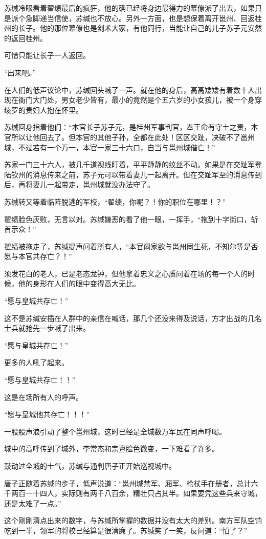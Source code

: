 苏缄冷眼看着翟绩最后的疯狂，他的确已经将身边最得力的幕僚派了出去，如果只是派个急脚递当信使，苏缄也不放心。另外一方面，也是想保着离开邕州、回返桂州的长子。他的那位幕僚也是剑术大家，有他同行，当能让自己的儿子苏子元安然的返回桂州。

可惜只能让长子一人返回。

“出来吧。”

在人们的低声议论中，苏缄回头喊了一声。就在他的身后，高高矮矮有着数十人出现在衙门大门处，男女老少皆有，最小的竟然是个五六岁的小女孩儿，被一个身穿绫罗的贵妇人抱在怀里。

苏缄回身指着他们：“本官长子苏子元，是桂州军事判官，奉王命有守土之责，本官所以让他回去了。但本官的其他子孙，全都在此处！区区交趾，决破不了邕州城，不过若有一个万一，本官一家三十六口，自当与邕州城偕亡！”

苏家一门三十六人，被几千道视线盯着，平平静静的纹丝不动。如果是在交趾军登陆钦州的消息传来之前，苏子元可以带着妻儿一起离开。但在交趾军至的消息传到后，再将妻儿一起带走，邕州城就没办法守了。

苏缄转又等着临阵脱逃的军校，“翟绩，你呢？！你的职位在哪里！？”

翟绩脸色灰败，无言以对。苏缄嫌恶的看了他一眼，一挥手，“拖到十字街口，斩首示众！”

翟绩被拖走了，苏缄提声问着所有人，“本官阖家欲与邕州同生死，不知尔等是否愿与本官共存亡？！”

须发花白的老人，已是老态龙钟，但他拿着忠义之心质问着在场的每一个人的时候，他的身形在人们的眼中变得高大无比。

“愿与皇城共存亡！”

这不是苏缄安插在人群中的亲信在喊话，那几个还没来得及说话，方才出战的几名士兵就抢先一步喊了出来。

“愿与皇城共存亡！”

更多的人吼了起来。

“愿与皇城共存亡！！”

这是在场所有人的呼声。

“愿与皇城他共存亡！！！”

一股股声浪引动了整个邕州城，这时已经是全城数万军民在同声呼喝。

城中的高呼传到了城外，李常杰和宗亶脸色微变，一下难看了许多。

鼓动过全城的士气，苏缄与通判唐子正开始巡视城中。

唐子正随着苏缄的步子，低声说道：“邕州城禁军、厢军、枪杖手在册者，总计六千两百一十四人，实际则有两千八百余，精壮只占其半。如果要凭这些兵来守城，还是太难了一点。”

这个刚刚清点出来的数字，与苏缄所掌握的数据并没有太大的差别。南方军队空饷吃到一半，领军的将校已经算是很清廉了。苏缄笑了一笑，反问道：“怕了？”

